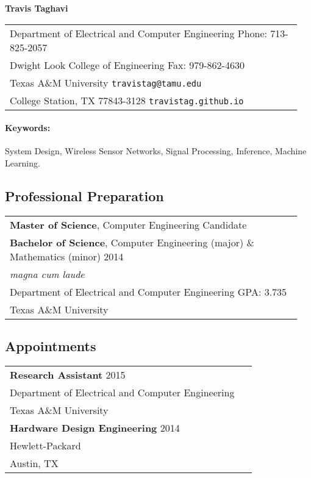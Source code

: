 \documentclass[11pt]{article}
\begin{document}
\begin{center}
{\bfseries \Large Travis Taghavi}
\end{center}

\begin{center}
\begin{tabular}{p{0.95\linewidth}}
Department of Electrical and Computer Engineering
\hfill Phone: 713-825-2057 \\
Dwight Look College of Engineering
\hfill Fax: 979-862-4630 \\
Texas A\&M University
\hfill \texttt{travistag@tamu.edu} \\
College Station, TX 77843-3128
\hfill \texttt{travistag.github.io}
\end{tabular}
\end{center}

\paragraph{Keywords:} System Design, Wireless Sensor Networks, Signal Processing, Inference, Machine Learning.

\subsection*{Professional Preparation}

\begin{center}
\begin{tabular}{p{0.95\linewidth}}
\textbf{Master of Science}, Computer Engineering \hfill Candidate \\
\textbf{Bachelor of Science}, Computer Engineering (major) \& Mathematics (minor) \hfill 2014 \\
{\em magna cum laude}\\
Department of Electrical and Computer Engineering \hfill GPA: 3.735\\
Texas A\&M University
\end{tabular}
\end{center}

\subsection*{Appointments}

\begin{center}
\begin{tabular}{p{0.95\linewidth}}
\textbf{Research Assistant} \hfill 2015 \\
Department of Electrical and Computer Engineering \\
Texas A\&M University \\[4pt]
\textbf{Hardware Design Engineering} \hfill 2014 \\
Hewlett-Packard \\
Austin, TX
\end{tabular}
\end{center}
\end{document}
